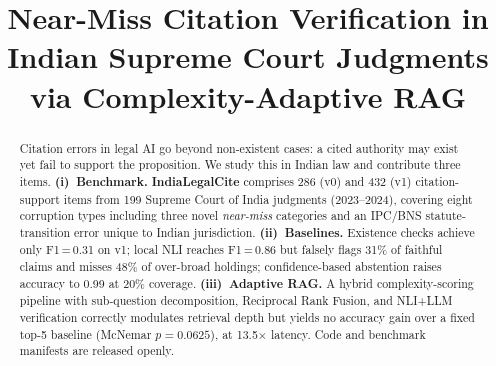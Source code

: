 \documentclass[conference]{IEEEtran}
\begin{document}
\title{Near-Miss Citation Verification in Indian Supreme Court Judgments\\
via Complexity-Adaptive RAG}

\author{
  \and
  \and
  \and
}

\maketitle

\begin{abstract}
Citation errors in legal AI go beyond non-existent cases: a cited authority may exist yet fail
to support the proposition. We study this in Indian law and contribute three items.
\textbf{(i)~Benchmark.} \textbf{IndiaLegalCite} comprises 286 (v0) and 432 (v1) citation-support
items from 199 Supreme Court of India judgments (2023--2024), covering eight corruption types
including three novel \emph{near-miss} categories and an IPC/BNS statute-transition error unique
to Indian jurisdiction.
\textbf{(ii)~Baselines.} Existence checks achieve only F1\,=\,0.31 on v1; local NLI reaches
F1\,=\,0.86 but falsely flags 31\% of faithful claims and misses 48\% of over-broad holdings;
confidence-based abstention raises accuracy to 0.99 at 20\% coverage.
\textbf{(iii)~Adaptive RAG.} A hybrid complexity-scoring pipeline with sub-question decomposition,
Reciprocal Rank Fusion, and NLI+LLM verification correctly modulates retrieval depth but yields
no accuracy gain over a fixed top-5 baseline (McNemar $p=0.0625$), at 13.5$\times$ latency.
Code and benchmark manifests are released openly.
\end{abstract}
\end{document}

